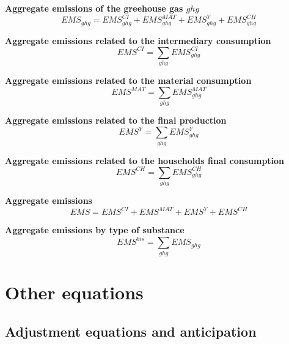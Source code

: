 \documentclass[12pt]{article}
\numberwithin{equation}{section}
\begin{document}
\noindent \textbf{Aggregate emissions of the greehouse gas $ghg$} 
\begin{dmath}
EMS_{ghg} = EMS^{CI}_{ghg} + EMS^{MAT}_{ghg} + EMS^{Y}_{ghg} + EMS^{CH}_{ghg}
\label{ghg_emissions.mdlEMS[ghg]}
\end{dmath}

\noindent \textbf{Aggregate emissions related to the intermediary consumption} 
\begin{dmath}
EMS^{CI} = \sum_{ghg} EMS^{CI}_{ghg}
\label{ghg_emissions.mdlEMS_CI}
\end{dmath}

\noindent \textbf{Aggregate emissions related to the material consumption} 
\begin{dmath}
EMS^{MAT} = \sum_{ghg} EMS^{MAT}_{ghg}
\label{ghg_emissions.mdlEMS_MAT}
\end{dmath}

\noindent \textbf{Aggregate emissions related to the final production} 
\begin{dmath}
EMS^{Y} = \sum_{ghg} EMS^{Y}_{ghg}
\label{ghg_emissions.mdlEMS_Y}
\end{dmath}

\noindent \textbf{Aggregate emissions related to the households final consumption} 
\begin{dmath}
EMS^{CH} = \sum_{ghg} EMS^{CH}_{ghg}
\label{ghg_emissions.mdlEMS_CH}
\end{dmath}

\noindent \textbf{Aggregate emissions} 
\begin{dmath}
EMS = EMS^{CI} + EMS^{MAT} + EMS^{Y} + EMS^{CH}
\label{ghg_emissions.mdlEMS}
\end{dmath}

\noindent \textbf{Aggregate emissions by type of substance} 
\begin{dmath}
EMS^{bis} = \sum_{ghg} EMS_{ghg}
\label{ghg_emissions.mdlEMSbis}
\end{dmath}


\section{Other equations}





\subsection{Adjustment equations and anticipation}
\end{document}
